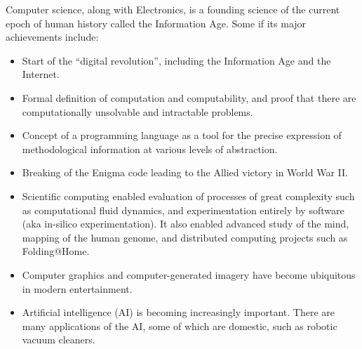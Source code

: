 \documentclass[8pt,a4paper,compress]{beamer}
\begin{document}
\begin{frame}[fragile]
\pause

Computer science, along with Electronics, is a founding science of the current epoch of human history called the Information Age. Some if its major achievements include:
\begin{itemize}
\pause
\item Start of the ``digital revolution'', including the Information Age and the Internet.
\pause
\item Formal definition of computation and computability, and proof that there are computationally unsolvable and intractable problems.
\pause
\item Concept of a programming language as a tool for the precise expression of methodological information at various levels of abstraction.
\pause
\item Breaking of the Enigma code leading to the Allied victory in World War II.
\pause
\item Scientific computing enabled evaluation of processes of great complexity such as computational fluid dynamics, and experimentation entirely by software (aka in-silico experimentation). It also enabled advanced study of the mind, mapping of the human genome, and distributed computing projects such as Folding@Home.
\pause
\item Computer graphics and computer-generated imagery have become ubiquitous in modern entertainment.
\pause
\item Artificial intelligence (AI) is becoming increasingly important. There are many applications of the AI, some of which are domestic, such as robotic vacuum cleaners.
\end{itemize}
\end{frame}
\end{document}
